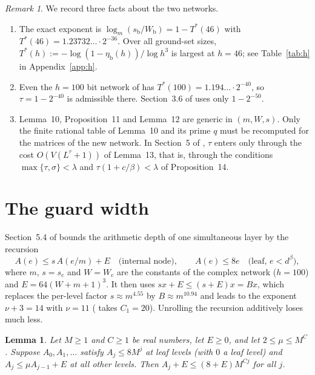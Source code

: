 \documentclass[11pt]{article}
\numberwithin{equation}{section}
\numberwithin{table}{section}
\newtheorem{lemma}[theorem]{Lemma}
\theoremstyle{remark}
\newtheorem{remark}[theorem]{Remark}
\newcommand{\OAI}{\cite{OAI}}
\newcommand{\Wb}{W_{\mathrm b}}
\newcommand{\sbb}{s_{\mathrm b}}
\newcommand{\etab}{\eta_{\mathrm b}}
\newcommand{\Wc}{W_{\mathrm c}}
\newcommand{\scc}{s_{\mathrm c}}
\begin{document}
\begin{remark}\label{rem:networks}
We record three facts about the two networks.
\begin{enumerate}
\item The exact exponent is
$\log_m(\sbb/\Wb)=1-T^*(46)$ with $T^*(46)=1.23732\ldots\cdot2^{-36}$.
Over all ground-set sizes, $T^*(h):=-\log(1-\etab(h))/\log h^3$ is
largest at $h=46$; see Table~\ref{tab:h} in Appendix~\ref{app:h}.
\item Even the $h=100$ bit network of \OAI{} has
$T^*(100)=1.194\ldots\cdot2^{-40}$, so $\tau=1-2^{-40}$ is admissible
there. Section~3.6 of \OAI{} uses only $1-2^{-50}$.
\item Lemma~10, Proposition~11 and Lemma~12 are generic in
$(m,W,s)$. Only the finite rational table of Lemma~10 and its prime
$q$ must be recomputed for the matrices of the new network. In
Section~5 of \OAI, $\tau$ enters only through the cost $O(V(L^\tau+1))$ of
Lemma~13, that is, through the conditions $\max\{\tau,\sigma\}<\lambda$
and $\tau(1+c/\beta)<\lambda$ of Proposition~14.
\end{enumerate}
\end{remark}

\section{The guard width}\label{sec:guard}

Section~5.4 of \OAI{} bounds the arithmetic depth of one simultaneous
layer by the recursion
\begin{equation}\label{eq:depth-rec}
 A(e)\le s\,A(e/m)+E\quad\text{(internal node)},\qquad
 A(e)\le 8e\quad\text{(leaf, $e<d^\beta$)},
\end{equation}
where $m$, $s=\scc$ and $W=\Wc$ are the constants of the complex network
($h=100$) and $E=64(W+m+1)^3$. It then uses $sx+E\le(s+E)x=Bx$, which
replaces the per-level factor $s\approx m^{4.55}$ by $B\approx m^{10.94}$
and leads to the exponent $\nu+3=14$ with $\nu=11$ (\OAI{} takes
$C_1=20$). Unrolling the recursion additively loses much less.

\begin{lemma}\label{lem:unroll}
Let $M\ge1$ and $C\ge1$ be real numbers, let $E\ge0$, and let
$2\le\mu\le M^C$.
Suppose $A_0,A_1,\ldots$ satisfy $A_j\le 8M^j$ at leaf levels (with $0$
a leaf level) and $A_j\le\mu A_{j-1}+E$ at all other levels. Then
$A_j+E\le(8+E)M^{Cj}$ for all $j$.
\end{lemma}
\end{document}
